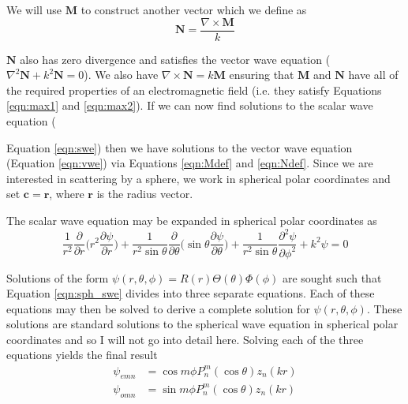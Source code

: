 \noindent We will use $\mathbf{M}$ to construct another vector which we define as 
\begin{equation}
\label{eqn:Ndef}
\mathbf{N}=\frac{\nabla \times \mathbf{M}}{k}
\end{equation}

\noindent $\mathbf{N}$ also has zero divergence and satisfies the vector wave equation ($\nabla^2\mathbf{N}+k^2\mathbf{N}=0$).  We also have $\nabla \times \mathbf{N} = k\mathbf{M}$ ensuring that $\mathbf{M}$ and $\mathbf{N}$ have all of the required properties of an electromagnetic field (i.e. they satisfy Equations \ref{eqn:max1} and \ref{eqn:max2}).  If we can now find solutions to the scalar wave equation ({Equation \ref{eqn:swe}) then we have solutions to the vector wave equation (Equation \ref{eqn:vwe}) via Equations \ref{eqn:Mdef} and \ref{eqn:Ndef}.    Since we are interested in scattering by a sphere, we work in spherical polar coordinates and set $\mathbf{c}=\mathbf{r}$, where $\mathbf{r}$ is the radius vector.

The scalar wave equation may be expanded in spherical polar coordinates as
\begin{equation}
\label{eqn:sph_swe}
\frac{1}{r^2}\frac{\partial}{\partial r}\Big(r^2\frac{\partial \psi}{\partial r} \Big) + \frac{1}{r^2\sin\theta}\frac{\partial}{\partial \theta}\Big(\sin\theta\frac{\partial \psi}{\partial \theta}\Big) + \frac{1}{r^2\sin\theta}\frac{\partial^2\psi}{\partial\phi^2}+k^2\psi=0
\end{equation}


\noindent Solutions of the form $\psi(r,\theta,\phi)=R(r)\Theta(\theta)\Phi(\phi)$ are sought such that Equation \ref{eqn:sph_swe} divides into three separate equations.  Each of these equations may then be solved to derive a complete solution for $\psi(r,\theta,\phi)$.  These solutions are standard solutions to the spherical wave equation in spherical polar coordinates and so I will not go into detail here.  Solving each of the three equations yields the final result
\begin{align}
\label{eqn:e_soln}
\psi_{emn}&=\cos m\phi P_n^m(\cos\theta)z_n(kr) \\
\label{eqn:o_soln}
\psi_{omn}&=\sin m\phi P_n^m(\cos\theta)z_n(kr) 
\end{align}

}

